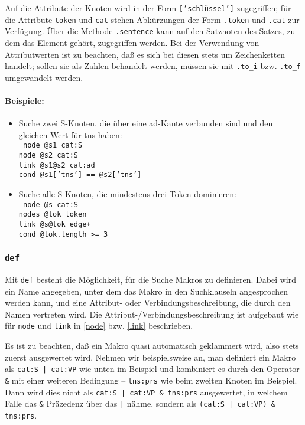 \documentclass[12pt]{scrartcl}
\begin{document}
Auf die Attribute der Knoten wird in der Form \texttt{['schlüssel']} zugegriffen; für die Attribute \texttt{token} und \texttt{cat} stehen Abkürzungen der Form \texttt{.token} und \texttt{.cat} zur Verfügung. Über die Methode \texttt{.sentence} kann auf den Satznoten des Satzes, zu dem das Element gehört, zugegriffen werden. Bei der Verwendung von Attributwerten ist zu beachten, daß es sich bei diesen stets um Zeichenketten handelt; sollen sie als Zahlen behandelt werden, müssen sie mit \texttt{.to\_i} bzw. \texttt{.to\_f} umgewandelt werden.


\paragraph*{Beispiele:}
\begin{itemize}
	\item Suche zwei S-Knoten, die über eine ad-Kante verbunden sind und den gleichen Wert für tns haben:\\
	{\tt
	node @s1 cat:S\\[-.4ex]
	node @s2 cat:S\\[-.4ex]
	link @s1@s2 cat:ad\\[-.4ex]
	cond @s1['tns'] == @s2['tns']
	}
	\item Suche alle S-Knoten, die mindestens drei Token dominieren:\\
	{\tt
	node @s cat:S\\[-.4ex]
	nodes @tok token\\[-.4ex]
	link @s@tok edge+\\[-.4ex]
	cond @tok.length >= 3
	}
\end{itemize}


\subsubsection{\texttt{def}}\label{def}

Mit \texttt{def} besteht die Möglichkeit, für die Suche Makros zu definieren. Dabei wird ein Name angegeben, unter dem das Makro in den Suchklauseln angesprochen werden kann, und eine Attribut- oder Verbindungsbeschreibung, die durch den Namen vertreten wird. Die Attribut-/Verbindungsbeschreibung ist aufgebaut wie für \texttt{node} und \texttt{link} in \ref{node} bzw. \ref{link} beschrieben.

Es ist zu beachten, daß ein Makro quasi automatisch geklammert wird, also stets zuerst ausgewertet wird. Nehmen wir beispielsweise an, man definiert ein Makro als \texttt{cat:S | cat:VP} wie unten im Beispiel und kombiniert es durch den Operator \texttt{\&} mit einer weiteren Bedingung – \texttt{tns:prs} wie beim zweiten Knoten im Beispiel. Dann wird dies nicht als \texttt{cat:S | cat:VP \& tns:prs} ausgewertet, in welchem Falle das \texttt{\&} Präzedenz über das \texttt{|} nähme, sondern als \texttt{(cat:S | cat:VP) \& tns:prs}.
\end{document}
